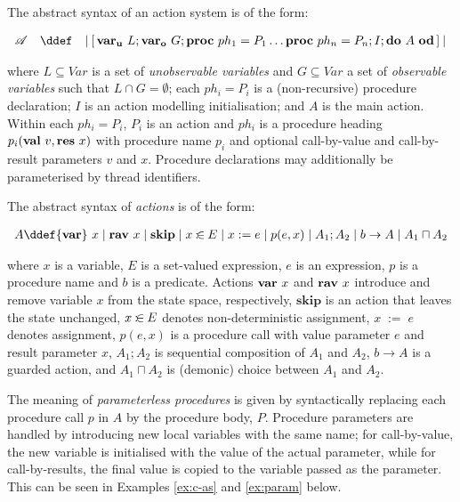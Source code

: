 \documentclass[11pt]{llncs}
\def \proc{{\bf proc}\ }
\def \lact{\mathop{|\joinrel\![}}
\def \ract{\mathop{]\joinrel\!|}}
\def \nasgn {\mathbin{:\joinrel\in}}
\def \asgn  {{\;:=\;}}
\def \var {{\bf var}\ }
\def \rav {{\bf rav}\ }
\def \lvar {{\bf var_u}\ }
\def \gvar {{\bf var_o}\ }
\def \val {{\bf val}\ }
\def \res {{\bf res}\ }
\newcommand{\sskip}{\mathbf{skip}}
\newcommand{\ddo}{\mathbf{do}}
\newcommand{\ood}{\mathbf{od}}
\newcommand{\msA}{\mathscr{A}}
\begin{document}
The abstract syntax of an action system is of the form:\smallskip

\hfill $\begin{array}[t]{rcl} \msA & \ddef & \lact
  \begin{array}[t]{@{}l@{}}
    \lvar L ; \gvar G ; 
    \proc ph_1 = P_1 \dots \proc ph_n = P_n  ; I ;
    \ddo\ A\ \ood  \ract 
  \end{array}
\end{array}$\hfill{}\smallskip

\noindent
where $L \subseteq Var$ is a set of \emph{unobservable variables} and
$G \subseteq Var$ a set of \emph{observable variables} such that
$L \cap G = \emptyset$; each $ph_i = P_i$ is a (non-recursive)
procedure declaration; $I$ is an action modelling initialisation; and
$A$ is the main action. Within each $ph_i = P_i$, $P_i$ is an action
and $ph_i$ is a procedure heading $p_i(\val v, \res x)$ with procedure
name $p_i$ and optional call-by-value and call-by-result parameters
$v$ and $x$. Procedure declarations may additionally be parameterised
by thread identifiers.  

The abstract syntax of \emph{actions} is of the form:\smallskip

\noindent\hfill
$\begin{array}{rcl} A \ddef \var x \mid \rav x \mid \sskip \mid x \nasgn E \mid x \asgn e \mid
  p(e,x) \mid
  A_1 ; A_2 \mid b \to A \mid A_1 \sqcap A_2
\end{array}$\hfill\smallskip

\noindent where $x$ is a variable, $E$ is a set-valued expression, $e$
is an expression, $p$ is a procedure name and $b$ is a predicate.  Actions
$\var x$ and 
$\rav x$ introduce and remove variable $x$ from the state space,
respectively, $\sskip$ is an action that leaves the state unchanged,
$x \nasgn E$ denotes non-deterministic assignment, $x \asgn e$ denotes
assignment, $p(e,x)$ is a procedure call with value parameter $e$ and
result parameter $x$,
$A_1 ; A_2$ is sequential composition of $A_1$ and $A_2$,
$b\to A$ is a guarded action, and $A_1 \sqcap A_2$ is (demonic) choice
between $A_1$ and $A_2$. 


The meaning of \emph{parameterless procedures} is given by
syntactically replacing each procedure call $p$ in $A$ by the
procedure body, $P$.  Procedure parameters are handled by introducing
new local variables with the same name; for call-by-value, the new
variable is initialised with the value of the actual parameter, while
for call-by-results, the final value is copied to the variable passed
as the parameter.  This can be seen in Examples \ref{ex:c-as} and
\ref{ex:param} below.
\end{document}
